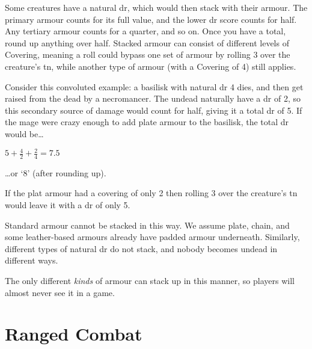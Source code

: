 \begin{multicols}{2}
Some creatures have a natural \gls{dr}, which would then stack with their armour.
The primary armour counts for its full value, and the lower \gls{dr} score counts for half.
Any tertiary armour counts for a quarter, and so on.
Once you have a total, round up anything over half.
Stacked armour can consist of different levels of Covering, meaning a roll could bypass one set of armour by rolling 3 over the creature's \gls{tn}, while another type of armour (with a Covering of 4) still applies.

Consider this convoluted example: a basilisk with natural \gls{dr} 4 dies, and then get raised from the dead by a necromancer.
The undead naturally have a \gls{dr} of 2, so this secondary source of damage would count for half, giving it a total \gls{dr} of 5.
If the mage were crazy enough to add plate armour to the basilisk, the total \gls{dr} would be\ldots

\begin{center}
{
  \LARGE $5 + $\Large$\frac{4}{2} + $\normalsize$\frac{2}{4} =  7.5$
}
\end{center}

\ldots or `8' (after rounding up).

If the plat armour had a covering of only 2 then rolling 3 over the creature's \gls{tn} would leave it with a \gls{dr} of only 5.

Standard armour cannot be stacked in this way.
We assume plate, chain, and some leather-based armours already have padded armour underneath.
Similarly, different types of natural \gls{dr} do not stack, and nobody becomes undead in different ways.

The only different \emph{kinds} of armour can stack up in this manner, so players will almost never see it in a game.

\end{multicols}

\section{Ranged Combat}

